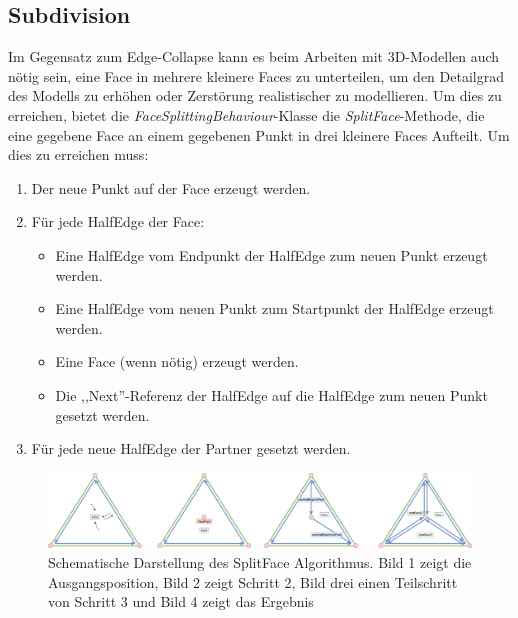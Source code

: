 \subsection{Subdivision}
Im Gegensatz zum Edge-Collapse kann es beim Arbeiten mit 3D-Modellen auch n\"otig sein, eine Face in mehrere kleinere Faces zu unterteilen, um den Detailgrad des Modells zu erh\"ohen oder Zerst\"orung realistischer zu modellieren. Um dies zu erreichen, bietet die \textit{FaceSplittingBehaviour}-Klasse die \textit{SplitFace}-Methode, die eine gegebene Face an einem gegebenen Punkt in drei kleinere Faces Aufteilt. Um dies zu erreichen muss:
\begin{enumerate}
	\item Der neue Punkt auf der Face erzeugt werden.
	\item F\"ur jede HalfEdge der Face:
	\begin{itemize}
		\item Eine HalfEdge vom Endpunkt der HalfEdge zum neuen Punkt erzeugt werden.
		\item Eine HalfEdge vom neuen Punkt zum Startpunkt der HalfEdge erzeugt werden.
		\item Eine Face (wenn n\"otig) erzeugt werden.
		\item Die ,,Next''-Referenz der HalfEdge auf die HalfEdge zum neuen Punkt gesetzt werden.
	\end{itemize}
	\item F\"ur jede neue HalfEdge der Partner gesetzt werden.
\end{enumerate}
\begin{figure}[H]
	\centering
	\includegraphics[width=1\linewidth]{Images/splitFace}
	\caption{Schematische Darstellung des SplitFace Algorithmus. Bild 1 zeigt die Ausgangsposition, Bild 2 zeigt Schritt 2, Bild drei einen Teilschritt von Schritt 3 und Bild 4 zeigt das Ergebnis}
	\label{fig:splitface}
\end{figure}

